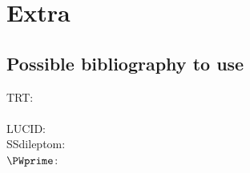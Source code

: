 \chapter{Extra}
\label{app:Extra}

\section{Possible bibliography to use}
TRT:\\
~\cite{CERN-THESIS-2006-025} \\

LUCID:\\


SSdileptom:\\

$\PWprime$:\\
~\cite{arXiv:1503.07874} \\
~\cite{arXiv:1512.00476} \\
~\cite{arXiv:1506.03116} \\

%
